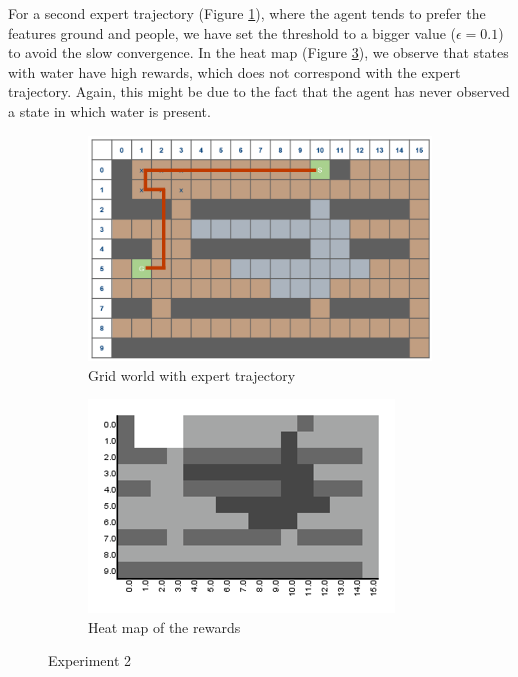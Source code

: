 \documentclass[10pt,a4paper,twocolumn]{article}
\begin{document}
For a second expert trajectory (Figure \ref{fig:experiment2trajectory}), where the agent tends to prefer the features ground and people, we have set the threshold to a bigger value ($\epsilon= 0.1$) to avoid the slow convergence. In the heat map (Figure \ref{fig:experiment2heatmap}), we observe that states with water have high rewards, which does not correspond with the expert trajectory. Again, this might be due to the fact that the agent has never observed a state in which water is present.

\begin{figure}[h]
\begin{subfigure}[b]{0.5\textwidth}
	\includegraphics[width=\textwidth]{experiment_2_gridworld}
	\caption{Grid world with expert trajectory}
	\label{fig:experiment2trajectory}
\end{subfigure}
\begin{subfigure}[b]{0.5\textwidth}
	\includegraphics[width=\textwidth]{experiment_2_heatmap}
	\caption{Heat map of the rewards}
	\label{fig:experiment2heatmap}
\end{subfigure}
\caption{Experiment 2}
\end{figure}
\end{document}
